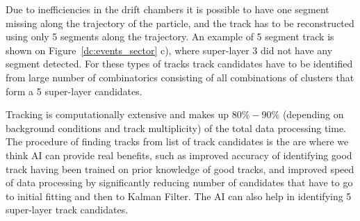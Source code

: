 Due to inefficiencies in the drift chambers it is possible to have one segment missing along the trajectory of the particle, and the track has to be reconstructed using only 5 segments along the trajectory. An example of 5 segment track is shown on Figure~\ref{dc:events_sector} c), where super-layer 3 did not have any segment detected. For these types of tracks track candidates have to be identified from large number of combinatorics consisting of all combinations of clusters that form a  5 super-layer candidates. 

Tracking is computationally extensive and makes up $80\%-90\%$ (depending on background conditions and track multiplicity) of the total data processing time. The procedure of finding tracks from list of track candidates is the are where we think AI can provide real benefits, such as improved accuracy of identifying good track having been trained on prior knowledge  of good tracks, and improved speed of data processing by significantly reducing number of candidates that have to go to initial fitting and then to Kalman Filter. The AI can also help in identifying 5 super-layer track candidates.


